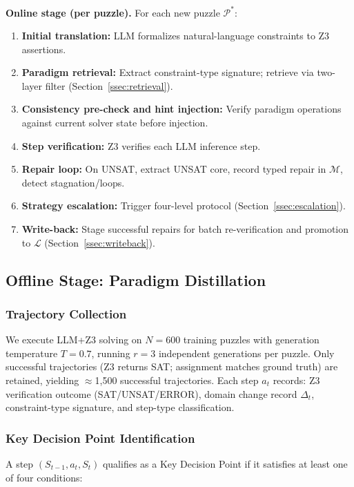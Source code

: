 \textbf{Online stage (per puzzle).} For each new puzzle $\mathcal{P}^*$:
\begin{enumerate}
    \item \textbf{Initial translation:} LLM formalizes natural-language constraints to Z3 assertions.
    \item \textbf{Paradigm retrieval:} Extract constraint-type signature; retrieve via two-layer filter (Section~\ref{ssec:retrieval}).
    \item \textbf{Consistency pre-check and hint injection:} Verify paradigm operations against current solver state before injection.
    \item \textbf{Step verification:} Z3 verifies each LLM inference step.
    \item \textbf{Repair loop:} On UNSAT, extract UNSAT core, record typed repair in $\mathcal{M}$, detect stagnation/loops.
    \item \textbf{Strategy escalation:} Trigger four-level protocol (Section~\ref{ssec:escalation}).
    \item \textbf{Write-back:} Stage successful repairs for batch re-verification and promotion to $\mathcal{L}$ (Section~\ref{ssec:writeback}).
\end{enumerate}

\subsection{Offline Stage: Paradigm Distillation}

\subsubsection{Trajectory Collection}

We execute LLM+Z3 solving on $N = 600$ training puzzles with generation temperature $T = 0.7$, running $r = 3$ independent generations per puzzle. Only successful trajectories (Z3 returns SAT; assignment matches ground truth) are retained, yielding $\approx$1,500 successful trajectories. Each step $a_t$ records: Z3 verification outcome (SAT/UNSAT/ERROR), domain change record $\Delta_t$, constraint-type signature, and step-type classification.

\subsubsection{Key Decision Point Identification}
\label{ssec:kdp}

A step $(S_{t-1}, a_t, S_t)$ qualifies as a Key Decision Point if it satisfies at least one of four conditions:

